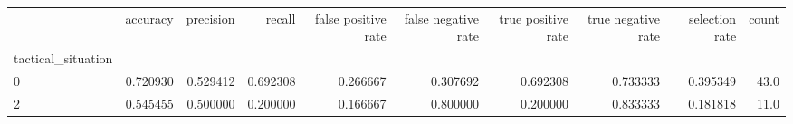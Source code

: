 \begin{tabular}{lrrrrrrrrr}
\toprule
{} &  accuracy &  precision &    recall &  false positive rate &  false negative rate &  true positive rate &  true negative rate &  selection rate &  count \\
tactical\_situation &           &            &           &                      &                      &                     &                     &                 &        \\
\midrule
0                  &  0.720930 &   0.529412 &  0.692308 &             0.266667 &             0.307692 &            0.692308 &            0.733333 &        0.395349 &   43.0 \\
2                  &  0.545455 &   0.500000 &  0.200000 &             0.166667 &             0.800000 &            0.200000 &            0.833333 &        0.181818 &   11.0 \\
\bottomrule
\end{tabular}
